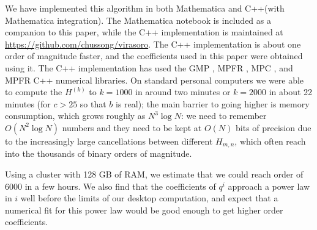 \begin{subappendices}
We have implemented this algorithm in both Mathematica and C++(with Mathematica integration). The Mathematica notebook is included as a companion to this paper, while the C++ implementation  is maintained at \url{https://github.com/chussong/virasoro}. The C++ implementation is about one order of magnitude faster, and the coefficients used in this paper were obtained using it. The C++ implementation has used the GMP \cite{gnu:gmp}, MPFR \cite{gnu:mpfr}, MPC \cite{gnu:mpc}, and MPFR C++ \cite{gnu:mpfrcpp} numerical libraries. On standard personal computers we were able to compute the $H^{(k)}$ to $k=1000$ in around two minutes or $k=2000$ in about 22 minutes (for $c>25$ so that $b$ is real); the main barrier to going higher is memory consumption, which grows roughly as $N^3 \log N$: we need to remember $O(N^2 \log N)$ numbers and they need to be kept at $O(N)$ bits of precision due to the increasingly large cancellations between different $H_{m,n}$, which often reach into the thousands of binary orders of magnitude. 

Using a cluster with 128 GB of RAM, we estimate that we could reach order of $6000$ in a few hours. We also find that the coefficients of $q^i$ approach a power law in 
$i$ well before the limits of our desktop computation, and expect that a numerical fit for 
this power law would be good enough to get higher order coefficients.


\end{subappendices}
